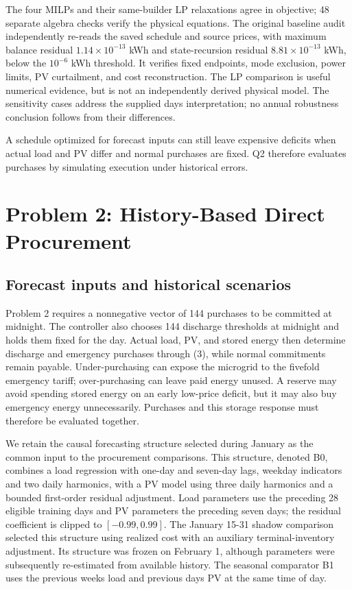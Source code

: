 \endgroup

The four MILPs and their same-builder LP relaxations agree in objective; 48 separate algebra checks verify the physical equations. The original baseline audit independently re-reads the saved schedule and source prices, with maximum balance residual \(1.14\times10^{-13}\) kWh and state-recursion residual \(8.81\times10^{-13}\) kWh, below the \(10^{-6}\) kWh threshold. It verifies fixed endpoints, mode exclusion, power limits, PV curtailment, and cost reconstruction. The LP comparison is useful numerical evidence, but is not an independently derived physical model. The sensitivity cases address the supplied day\textquotesingle s interpretation; no annual robustness conclusion follows from their differences.

A schedule optimized for forecast inputs can still leave expensive deficits when actual load and PV differ and normal purchases are fixed. Q2 therefore evaluates purchases by simulating execution under historical errors.

\section{Problem 2: History-Based Direct Procurement}\label{problem-2-history-based-direct-procurement}

\subsection{Forecast inputs and historical scenarios}\label{forecast-inputs-and-historical-scenarios}

Problem 2 requires a nonnegative vector of 144 purchases to be committed at midnight. The controller also chooses 144 discharge thresholds at midnight and holds them fixed for the day. Actual load, PV, and stored energy then determine discharge and emergency purchases through (3), while normal commitments remain payable. Under-purchasing can expose the microgrid to the fivefold emergency tariff; over-purchasing can leave paid energy unused. A reserve may avoid spending stored energy on an early low-price deficit, but it may also buy emergency energy unnecessarily. Purchases and this storage response must therefore be evaluated together.

\begingroup
{}

We retain the causal forecasting structure selected during January as the common input to the procurement comparisons. This structure, denoted B0, combines a load regression with one-day and seven-day lags, weekday indicators and two daily harmonics, with a PV model using three daily harmonics and a bounded first-order residual adjustment. Load parameters use the preceding 28 eligible training days and PV parameters the preceding seven days; the residual coefficient is clipped to \([-0.99,0.99]\). The January 15-31 shadow comparison selected this structure using realized cost with an auxiliary terminal-inventory adjustment. Its structure was frozen on February 1, although parameters were subsequently re-estimated from available history. The seasonal comparator B1 uses the previous week\textquotesingle s load and previous day\textquotesingle s PV at the same time of day.

